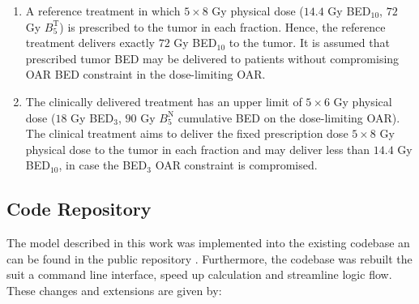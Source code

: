 \documentclass[\relativeRoot/ada.tex]{subfiles}
\begin{document}
\begin{enumerate}
    \item A reference treatment in which $5 \times 8$ Gy physical dose ($14.4$ Gy BED$_{10}$, $72$ Gy $B_5^{\text{T}}$) is prescribed to the tumor in each fraction. Hence, the reference treatment delivers exactly $72$ Gy BED$_{10}$ to the tumor. It is assumed that prescribed tumor BED may be delivered to patients without compromising OAR BED constraint in the dose-limiting OAR.

%    

    \item The clinically delivered treatment has an upper limit of $5 \times 6$ Gy physical dose ($18$ Gy BED$_{3}$, $90$ Gy $B_5^{\text{N}}$ cumulative BED on the dose-limiting OAR). The clinical treatment aims to deliver the fixed prescription dose $5 \times 8$ Gy physical dose to the tumor in each fraction and may deliver less than $14.4$ Gy BED$_{10}$, in case the BED$_{3}$ OAR constraint is compromised.
\end{enumerate}

\subsection{Code Repository}

The model described in this work was implemented into the existing codebase an can be found in the public repository \cite{adaptfx_package}. Furthermore, the codebase was rebuilt the suit a command line interface, speed up calculation and streamline logic flow. These changes and extensions are given by:\\
\end{document}
